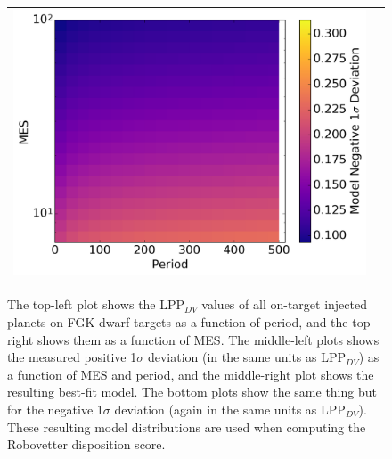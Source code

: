 \begin{figure}[hbtp]
\begin{tabular}{cc}
\includegraphics[width=0.5\linewidth]{ScoreFig-6.png}
\end{tabular}
\caption{The top-left plot shows the LPP$_{DV}$ values of all on-target injected planets on FGK dwarf targets as a function of period, and the top-right shows them as a function of MES. The middle-left plots shows the measured positive 1$\sigma$ deviation (in the same units as LPP$_{DV}$) as a function of MES and period, and the middle-right plot shows the resulting best-fit model. The bottom plots show the same thing but for the negative 1$\sigma$ deviation (again in the same units as LPP$_{DV}$). These resulting model distributions are used when computing the Robovetter disposition score.}
\label{score-fig-1}
\end{figure}
